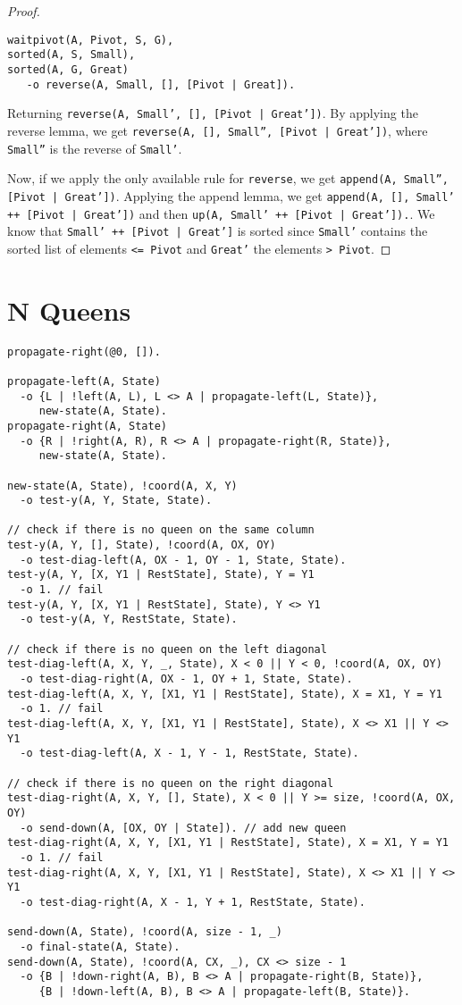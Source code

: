 \documentclass[9pt]{article}
\begin{document}
\begin{proof}
\begin{verbatim}
waitpivot(A, Pivot, S, G),
sorted(A, S, Small),
sorted(A, G, Great)
   -o reverse(A, Small, [], [Pivot | Great]).
\end{verbatim}

Returning \texttt{reverse(A, Small', [], [Pivot | Great'])}. By applying the reverse lemma, we get \texttt{reverse(A, [], Small'', [Pivot | Great'])}, where \texttt{Small''} is the reverse of \texttt{Small'}.

Now, if we apply the only available rule for \texttt{reverse}, we get \texttt{append(A, Small'', [Pivot | Great'])}. Applying the append lemma, we get \texttt{append(A, [], Small' ++ [Pivot | Great'])} and then \texttt{up(A, Small' ++ [Pivot | Great']).}. We know that \texttt{Small' ++ [Pivot | Great']} is sorted since \texttt{Small'} contains the sorted list of elements \texttt{<= Pivot} and \texttt{Great'} the elements \texttt{> Pivot}.

\end{proof}

\section{N Queens}

\begin{verbatim}
propagate-right(@0, []).

propagate-left(A, State)
  -o {L | !left(A, L), L <> A | propagate-left(L, State)},
     new-state(A, State).
propagate-right(A, State)
  -o {R | !right(A, R), R <> A | propagate-right(R, State)},
     new-state(A, State).

new-state(A, State), !coord(A, X, Y)
  -o test-y(A, Y, State, State).

// check if there is no queen on the same column
test-y(A, Y, [], State), !coord(A, OX, OY)
  -o test-diag-left(A, OX - 1, OY - 1, State, State).
test-y(A, Y, [X, Y1 | RestState], State), Y = Y1
  -o 1. // fail
test-y(A, Y, [X, Y1 | RestState], State), Y <> Y1
  -o test-y(A, Y, RestState, State).

// check if there is no queen on the left diagonal
test-diag-left(A, X, Y, _, State), X < 0 || Y < 0, !coord(A, OX, OY)
  -o test-diag-right(A, OX - 1, OY + 1, State, State).
test-diag-left(A, X, Y, [X1, Y1 | RestState], State), X = X1, Y = Y1
  -o 1. // fail
test-diag-left(A, X, Y, [X1, Y1 | RestState], State), X <> X1 || Y <> Y1
  -o test-diag-left(A, X - 1, Y - 1, RestState, State).

// check if there is no queen on the right diagonal
test-diag-right(A, X, Y, [], State), X < 0 || Y >= size, !coord(A, OX, OY)
  -o send-down(A, [OX, OY | State]). // add new queen
test-diag-right(A, X, Y, [X1, Y1 | RestState], State), X = X1, Y = Y1
  -o 1. // fail
test-diag-right(A, X, Y, [X1, Y1 | RestState], State), X <> X1 || Y <> Y1
  -o test-diag-right(A, X - 1, Y + 1, RestState, State).

send-down(A, State), !coord(A, size - 1, _)
  -o final-state(A, State).
send-down(A, State), !coord(A, CX, _), CX <> size - 1
  -o {B | !down-right(A, B), B <> A | propagate-right(B, State)},
     {B | !down-left(A, B), B <> A | propagate-left(B, State)}.
\end{verbatim}
\end{document}
